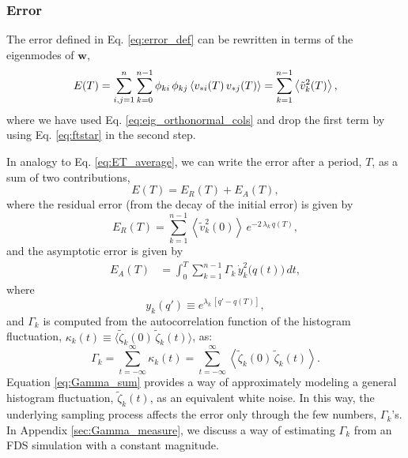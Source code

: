 \documentclass[reprint, superscriptaddress, floatfix]{revtex4-1}
\newcommand{\Err}{E}
\begin{document}
\subsubsection{Error}



The error defined in Eq. \eqref{eq:error_def}
can be rewritten in terms of the eigenmodes of $\mathbf w$,
%
\begin{align}
  \Err(T)
  =
  \sum_{i, j = 1}^n \sum_{k=0}^{n-1}
   \phi_{ki} \, \phi_{kj}
    \left\langle v_{*i}(T) \, v_{*j}(T) \right\rangle
  =
  \sum_{k = 1}^{n - 1}
    \left\langle
      {\tilde v}_k^2(T)
    \right\rangle
  ,
\notag
\end{align}
%
where we have used
Eq. \eqref{eq:eig_orthonormal_cols}
and drop the first term
by using Eq. \eqref{eq:ftstar}
in the second step.

In analogy to Eq. \eqref{eq:ET_average},
we can write the error after a period, $T$,
as a sum of two contributions,
%
\begin{equation}
  \Err(T)
  =
  \Err_R(T) + \Err_A(T),
  \label{eq:error_tot}
\end{equation}
%
where the residual error
(from the decay of the initial error)
is given by
%
\begin{equation}
  \Err_R(T)
  =
  \sum_{k = 1}^{n-1}
    \left\langle
      {\tilde v}_k^2(0)
    \right\rangle \,
    e^{ - 2 \, \lambda_k  \, q(T) },
  \label{eq:error_res}
\end{equation}
%
and the asymptotic error
is given by
%
\begin{align}
  \Err_A(T)
  &=
  \int_0^T
  \sum_{k = 1}^{n-1}
  \Gamma_k \, \dot y_k^2\bigl( q(t) \bigr) \, dt
  ,
\label{eq:error_asym}
\end{align}
%
where
%
\begin{equation}
  y_k(q') \equiv e^{\lambda_k \, [q' - q(T)]}
  ,
  \label{eq:uk_def}
\end{equation}
%
and $\Gamma_k$ is computed from
the autocorrelation function
of the histogram fluctuation,
$\kappa_k(t) \equiv \bigl\langle {\tilde \zeta}_k(0)
\, {\tilde \zeta}_k(t) \bigr\rangle$,
as:
%
\begin{equation}
  \Gamma_k
  = \sum_{t = -\infty}^\infty \kappa_k(t)
  = \sum_{t = -\infty}^\infty
  \left\langle {\tilde \zeta}_k(0)
            \, {\tilde \zeta}_k(t) \right\rangle
  .
  \label{eq:Gamma_sum}
\end{equation}
%
%
Equation \eqref{eq:Gamma_sum} provides a way
of approximately modeling
a general histogram fluctuation, ${\tilde \zeta}_k(t)$,
as an equivalent white noise.
In this way,
the underlying sampling process
affects the error only through the
few numbers, $\Gamma_k$'s.
%
In Appendix \ref{sec:Gamma_measure},
we discuss a way of estimating $\Gamma_k$
from an FDS simulation with a constant magnitude.
%
\end{document}
